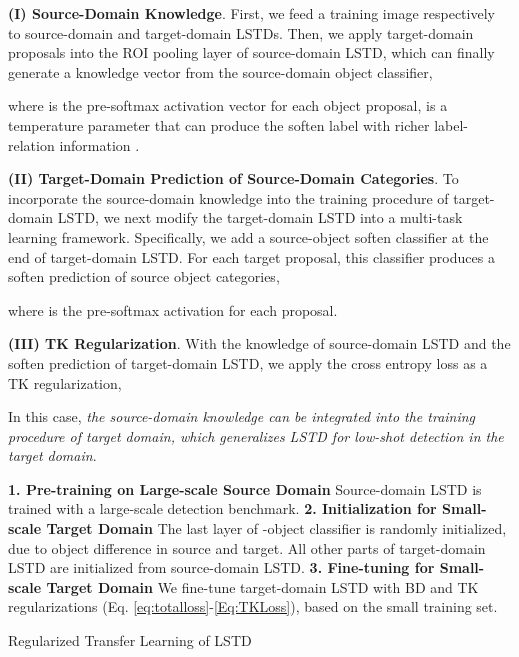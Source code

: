 \documentclass[letterpaper]{article} \usepackage{aaai18}  \usepackage{times}  \usepackage{helvet}  \usepackage{courier}  \usepackage{url}  \usepackage{graphicx}
\begin{document}
\textbf{(I) Source-Domain Knowledge}.
First,
we feed a training image respectively to source-domain and target-domain LSTDs.
Then,
we apply target-domain proposals into the ROI pooling layer of source-domain LSTD,
which can finally generate a knowledge vector from the source-domain object classifier,

where
 is the pre-softmax activation vector for each object proposal,
 is a temperature parameter that can produce the soften label with richer label-relation information \cite{Hinton2015}.

\textbf{(II) Target-Domain Prediction of Source-Domain Categories}.
To incorporate the source-domain knowledge  into the training procedure of target-domain LSTD,
we next modify the target-domain LSTD into a multi-task learning framework.
Specifically,
we add a source-object soften classifier at the end of target-domain LSTD.
For each target proposal,
this classifier produces a soften prediction of source object categories,

where
 is the pre-softmax activation for each proposal.

\textbf{(III) TK Regularization}.
With the knowledge  of source-domain LSTD and the soften prediction  of target-domain LSTD,
we apply the cross entropy loss as a TK regularization,

In this case,
\textit{the source-domain knowledge can be integrated into the training procedure of target domain,
which generalizes LSTD for low-shot detection in the target domain}.





\begin{algorithm}[t]
\begin{algorithmic}
   \STATE \textbf{1. Pre-training on Large-scale Source Domain}
   \STATE  Source-domain LSTD is trained with a large-scale detection benchmark.
   \STATE \textbf{2. Initialization for Small-scale Target Domain}
   \STATE  The last layer of -object classifier is randomly initialized, due to object difference in source and target.
   \STATE  All other parts of target-domain LSTD are initialized from source-domain LSTD.
   \STATE \textbf{3. Fine-tuning for Small-scale Target Domain}
   \STATE  We fine-tune target-domain LSTD with BD and TK regularizations (Eq. \ref{eq:totalloss}-\ref{Eq:TKLoss}),
          based on the small training set.
\end{algorithmic}
\caption{Regularized Transfer Learning of LSTD}
\label{alg}
\end{algorithm}
\end{document}
